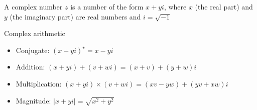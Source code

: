 \documentclass[8pt,a4paper,compress]{beamer}
\begin{document}
\begin{frame}[fragile]
\pause

\begin{minipage}{200pt}
A complex number $z$ is a number of the form $x+yi$, where $x$ (the real part) and $y$ (the imaginary part) are real numbers and $i=\sqrt{-1}$
\end{minipage}%
\hfill
\begin{minipage}{100pt}
\begin{center}
\end{center}
\end{minipage}%

\pause
\bigskip

Complex arithmetic
\begin{itemize}
\item Conjugate: $(x+yi)^\star=x-yi$

\item Addition: $(x+yi)+(v+wi) = (x+v) + (y+w)i$

\item Multiplication: $(x+yi)\times(v+wi) = (xv-yw) + (yv+xw)i$

\item Magnitude: $|x+yi|=\sqrt{x^2+y^2}$
\end{itemize}

\pause
\bigskip


\end{frame}
\end{document}
